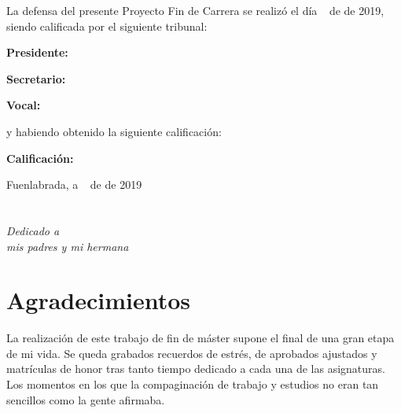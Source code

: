 \documentclass[a4paper, 12pt]{book}
\begin{document}
\vspace{1cm}
La defensa del presente Proyecto Fin de Carrera se realizó el día \qquad$\;\,$ de \qquad\qquad\qquad\qquad \newline de 2019, siendo calificada por el siguiente tribunal:


\vspace{0.5cm}
\textbf{Presidente:}

\vspace{1.2cm}
\textbf{Secretario:}

\vspace{1.2cm}
\textbf{Vocal:}


\vspace{1.2cm}
y habiendo obtenido la siguiente calificación:

\vspace{1cm}
\textbf{Calificación:}


\vspace{1cm}
\begin{flushright}
Fuenlabrada, a \qquad$\;\,$ de \qquad\qquad\qquad\qquad de 2019
\end{flushright}


\chapter*{}
\begin{flushright}
\textit{Dedicado a \\
mis padres y mi hermana}
\end{flushright}


\chapter*{Agradecimientos}

La realización de este trabajo de fin de máster supone el final de una gran etapa de mi vida. Se queda grabados recuerdos de estrés, de aprobados ajustados y matrículas de honor tras tanto tiempo dedicado a cada una de las asignaturas. Los momentos en los que la compaginación de trabajo y estudios no eran tan sencillos como la gente afirmaba.
\end{document}
